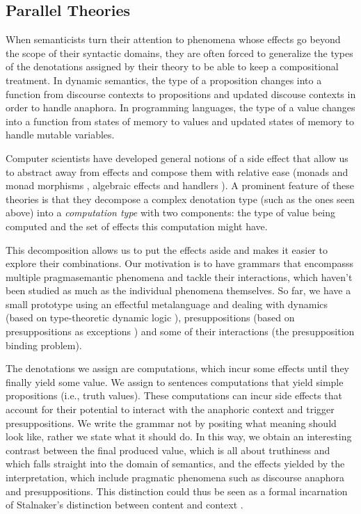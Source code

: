 \documentclass[a4paper,11pt,DIV=12]{scrartcl}
\begin{document}
\subsection{Parallel Theories}

When semanticists turn their attention to phenomena whose effects go beyond
the scope of their syntactic domains, they are often forced to generalize
the types of the denotations assigned by their theory to be able to keep a
compositional treatment. In dynamic semantics, the type of a proposition
changes into a function from discourse contexts to propositions and updated
discouse contexts in order to handle anaphora. In programming languages,
the type of a value changes into a function from states of memory to values
and updated states of memory to handle mutable variables.

Computer scientists have developed general notions of a side effect that
allow us to abstract away from effects and compose them with relative ease
(monads and monad morphisms \cite{moggi1990abstract}, algebraic effects and
handlers \cite{plotkin2013handling}). A prominent feature of these theories
is that they decompose a complex denotation type (such as the ones seen
above) into a \emph{computation type} with two components: the type of
value being computed and the set of effects this computation might have.

This decomposition allows us to put the effects aside and makes it easier
to explore their combinations. Our motivation is to have grammars that
encompasss multiple pragmasemantic phenomena and tackle their interactions,
which haven't been studied as much as the individual phenomena themselves.
So far, we have a small prototype using an effectful metalanguage and
dealing with dynamics (based on type-theoretic dynamic logic
\cite{de2006towards}), presuppositions (based on presuppositions as
exceptions \cite{lebedeva2012expression}) and some of their interactions
(the presupposition binding problem).

The denotations we assign are computations, which incur some effects until
they finally yield some value. We assign to sentences computations that
yield simple propositions (i.e., truth values). These computations can
incur side effects that account for their potential to interact with the
anaphoric context and trigger presuppositions. We write the grammar not by
positing what meaning should look like, rather we state what it should
do. In this way, we obtain an interesting contrast between the final
produced value, which is all about truthiness and which falls straight into
the domain of semantics, and the effects yielded by the interpretation,
which include pragmatic phenomena such as discourse anaphora and
presuppositions. This distinction could thus be seen as a formal
incarnation of Stalnaker's distinction between content and context
\cite{stalnaker1974pragmatic}.



\end{document}
